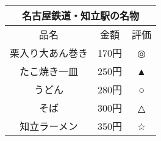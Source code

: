\documentclass[a4paper,12pt]{tarticle}
\begin{document}
\begin{tabular}{|c|c|c|}
\hline
\multicolumn{3}{|c|}{\textbf{名古屋鉄道・知立駅の名物}} \\ \hline
品名 & 金額 & 評価 \\ \hline
栗入り大あん巻き & 170円 & ◎ \\ \hline
たこ焼き一皿 & 250円 & ▲ \\ \hline
うどん & 280円 & ○ \\ \hline
そば & 300円 & △ \\ \hline
知立ラーメン & 350円 & ☆ \\ \hline
\end{tabular}
\end{document}
